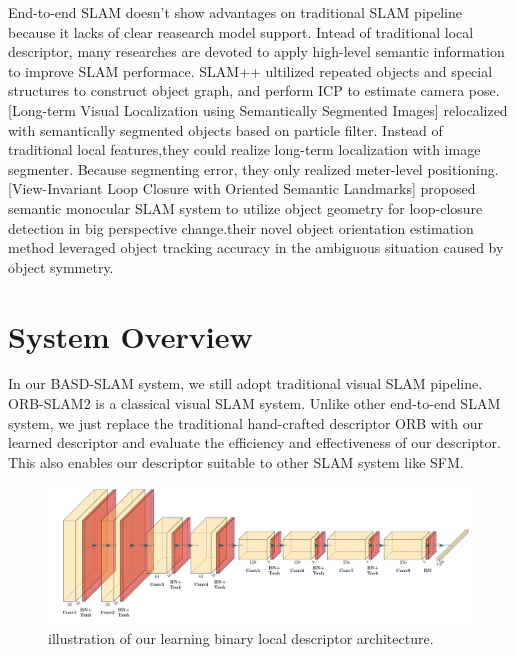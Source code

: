 \documentclass[conference]{IEEEtran}
\begin{document}
End-to-end SLAM doesn't show advantages on traditional SLAM pipeline because it lacks of clear reasearch model support. Intead of traditional local descriptor, many researches are devoted to apply high-level semantic information to improve SLAM performace. 
SLAM++ \cite{c22}ultilized repeated objects and special structures to construct object graph, and perform ICP to estimate camera pose.  
[Long-term Visual Localization using Semantically Segmented Images] \cite{c23}relocalized with semantically segmented objects based on particle filter. Instead of traditional local features,they could realize long-term localization with image segmenter. Because segmenting error, they only realized meter-level positioning.  
[View-Invariant Loop Closure with Oriented Semantic Landmarks] \cite{c24}proposed semantic monocular SLAM system  to utilize object geometry for loop-closure detection in big perspective change.their novel object orientation estimation method  leveraged object tracking accuracy in the ambiguous situation caused by object symmetry.



\section{System Overview}
In our BASD-SLAM system, we still adopt traditional visual SLAM pipeline. ORB-SLAM2 \cite{c25}is a classical visual SLAM system. Unlike other end-to-end SLAM system, we just replace the traditional hand-crafted descriptor ORB with our learned descriptor and evaluate the efficiency and effectiveness of our descriptor. This also enables our descriptor suitable to other SLAM system like SFM.


\begin{figure}[h]
\centering
\includegraphics[scale=0.36]{BASD_Net}
\caption{ illustration of our learning binary local descriptor architecture.} \scriptsize
\end{figure}
\end{document}
